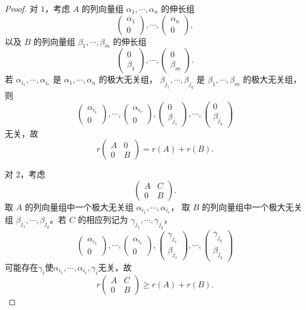 \begin{proof}
	对 $1$，考虑 $A$ 的列向量组 $\alpha_1,\cdots,\alpha_n$ 的伸长组
	\[
	\begin{pmatrix}\alpha_1\\0\end{pmatrix},\cdots,
	\begin{pmatrix}\alpha_n\\0\end{pmatrix},
	\]
	以及 $B$ 的列向量组 $\beta_1,\cdots,\beta_m$ 的伸长组
	\[
	\begin{pmatrix}0\\\beta_1\end{pmatrix},\cdots,
	\begin{pmatrix}0\\\beta_m\end{pmatrix}.
	\]
	若 $\alpha_{i_1},\cdots,\alpha_{i_r}$ 是 $\alpha_1,\cdots,\alpha_n$ 的极大无关组，
	$\beta_{j_1},\cdots,\beta_{j_q}$ 是 $\beta_1,\cdots,\beta_m$ 的极大无关组，则
	\[
	\begin{pmatrix}\alpha_{i_1}\\0\end{pmatrix},\cdots,
	\begin{pmatrix}\alpha_{i_r}\\0\end{pmatrix},
	\begin{pmatrix}0\\\beta_{j_1}\end{pmatrix},\cdots,
	\begin{pmatrix}0\\\beta_{j_q}\end{pmatrix}
	\]
	无关，故
	\[
	r\begin{pmatrix}
		A&0\\0&B
	\end{pmatrix}=r(A)+r(B).
	\]
	
	对 $2$，考虑
	\[
	\begin{pmatrix}
		A&C\\0&B
	\end{pmatrix}.
	\]
	取 $A$ 的列向量组中一个极大无关组 $\alpha_{i_1},\cdots,\alpha_{i_r}$，
	取 $B$ 的列向量组中一个极大无关组 $\beta_{j_1},\cdots,\beta_{j_q}$。若 $C$ 的相应列记为
	$\gamma_{j_1},\cdots,\gamma_{j_q}$，
	\[
	\begin{pmatrix}\alpha_{i_1}\\0\end{pmatrix},\cdots,
	\begin{pmatrix}\alpha_{i_r}\\0\end{pmatrix},
	\begin{pmatrix}\gamma_{j_1}\\\beta_{j_1}\end{pmatrix},\cdots,
	\begin{pmatrix}\gamma_{j_q}\\\beta_{j_q}\end{pmatrix}
	\]
	可能存在$\gamma_i$使$ \alpha_{i_1},\cdots,\alpha_{i_r},\gamma_i$无关，故
	\[
	r\begin{pmatrix}
		A&C\\0&B
	\end{pmatrix}\geq r(A)+r(B).
	\]
\end{proof}

